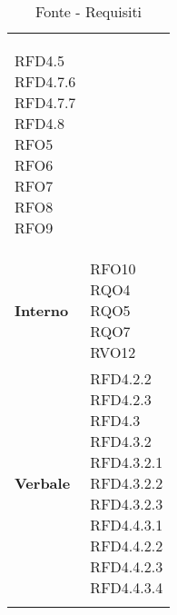 \begin{longtable}[H]{| >{\centering\bfseries}p{8cm} | >{\centering\arraybackslash}p{8cm} |}
{            RFD4.5 \\
            RFD4.7.6 \\
            RFD4.7.7 \\
            RFD4.8 \\
            RFO5 \\
            RFO6 \\
            RFO7 \\
            RFO8 \\
            RFO9 \\
            \rule{0pt}{2ex}
        } \\

    \rowcolor{white}
    Interno &
    \makecell{
        \rule{0pt}{4ex}
        RFO10 \\
        RQO4 \\
        RQO5 \\
        RQO7 \\
        RVO12 \\
        \rule{0pt}{2ex}
    } \\

    \rowcolor{white!80!lightgray!90}
    Verbale &
        \makecell{
            \rule{0pt}{4ex}
            RFD4.2.2 \\
            RFD4.2.3 \\
            RFD4.3 \\
            RFD4.3.2\\
            RFD4.3.2.1 \\
            RFD4.3.2.2 \\
            RFD4.3.2.3 \\
            RFD4.4.3.1 \\
            RFD4.4.2.2 \\
            RFD4.4.2.3 \\
            RFD4.4.3.4 \\
            \rule{0pt}{2ex}
        } \\

    \hline
    \rowcolor{white}
    \caption{Fonte - Requisiti}
    \label{tab:fonte_requisiti}
\end{longtable}
